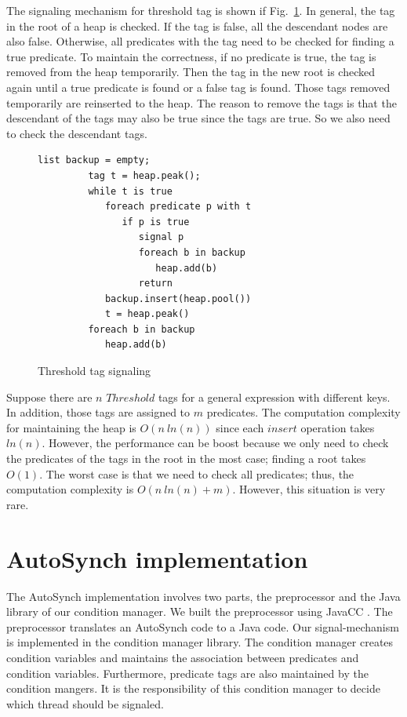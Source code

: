 \documentclass[preprint]{sigplanconf}
\begin{document}
The signaling mechanism for threshold tag is shown if Fig.~\ref{fig:th_sig}. In
general, the tag in the root of a heap is checked. If the tag is false, all the
descendant nodes are also false. Otherwise, all predicates with the tag
need to be checked for finding a true predicate. To maintain the correctness, 
if no predicate is true, the tag is removed from the heap temporarily. Then the
tag in the new root is checked again until a true predicate is found or a
false tag is found. Those tags removed temporarily are reinserted to the heap.
The reason to remove the tags is that the descendant of the tags may also be
true since the tags are true. So we also need to check the descendant tags.
\begin{figure}[ht!]
    \begin{Verbatim}[fontsize=\footnotesize,gobble=8,frame=lines,
            framesep=3mm]
         list backup = empty;
         tag t = heap.peak();
         while t is true
            foreach predicate p with t
               if p is true
                  signal p
                  foreach b in backup 
                     heap.add(b)
                  return
            backup.insert(heap.pool())
            t = heap.peak()
         foreach b in backup 
            heap.add(b)
    \end{Verbatim}
  \caption{Threshold tag signaling}
  \label{fig:th_sig}
\end{figure}


Suppose there are $n$ $Threshold$ tags for a general expression with different 
keys. In addition, those tags are assigned to $m$ predicates. The computation
complexity for maintaining the heap is $O(n\ ln(n))$ since each $insert$ 
operation takes $ln(n)$. However, the performance can be boost because we only
need to check the predicates of the tags in the root in the most case; finding
a root takes $O(1)$. The worst case is that we need to check all predicates;
thus, the computation complexity is $O(n\ ln(n) + m)$. However, this situation
is very rare. 

\section{AutoSynch implementation} \label{sec:imp}
The AutoSynch implementation involves two parts, the preprocessor and the Java
library of our condition manager. We built the preprocessor using JavaCC
\cite{kod04}. The preprocessor translates an AutoSynch code to a Java code. Our
signal-mechanism is implemented in the condition manager library. 
The condition manager creates condition variables and maintains the association 
between predicates and condition variables. Furthermore, predicate tags are 
also maintained by the condition mangers. It is the responsibility of this
condition manager to decide which thread should be signaled. 
\end{document}
